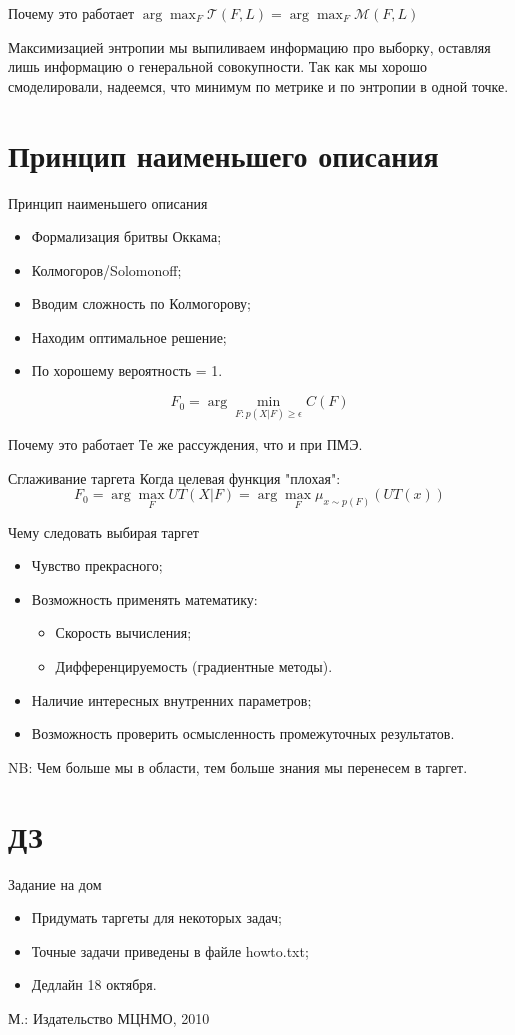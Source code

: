 \documentclass[14pt, fleqn, xcolor={dvipsnames, table}]{beamer}
\begin{document}
\begin{frame}{Почему это работает} %
$\arg\max_{F} \mathcal{T}(F, L) = \arg\max_{F} \mathcal{M}(F, L)$

Максимизацией энтропии мы выпиливаем информацию про выборку, оставляя лишь информацию о генеральной совокупности. Так как мы хорошо смоделировали, надеемся, что минимум по метрике и по энтропии в одной точке.
\end{frame}

\section{Принцип наименьшего описания}

\begin{frame}{Принцип наименьшего описания}
\begin{itemize}
  \item Формализация бритвы Оккама;
  \item Колмогоров/Solomonoff;
  \item Вводим сложность по Колмогорову;
  \item Находим оптимальное решение; 
  \item По хорошему вероятность = 1.
\end{itemize}
$$
  F_0 = \arg\min_{F:p(X|F)\ge\epsilon} C(F)
$$

\end{frame}

\begin{frame}{Почему это работает} %
Те же рассуждения, что и при ПМЭ.
\end{frame}

\begin{frame}{Сглаживание таргета}
\centering
Когда целевая функция "плохая":
$$
F_0 = \arg\max_F UT(X|F) = \arg\max_F \mu_{x \sim p(F)}(UT(x))
$$
\end{frame}

\begin{frame}{Чему следовать выбирая таргет}
\begin{itemize}
  \item Чувство прекрасного;
  \item Возможность применять математику:
  \begin{itemize}
    \item Скорость вычисления;
    \item Дифференцируемость (градиентные методы).
  \end{itemize}
  \item Наличие интересных внутренних параметров;
  \item Возможность проверить осмысленность промежуточных результатов.
\end{itemize}
NB: Чем больше мы в области, тем больше знания мы перенесем в таргет.
\end{frame}

\section{ДЗ}
\begin{frame}{Задание на дом}
\begin{itemize}
  \item Придумать таргеты для некоторых задач; 
  \item Точные задачи приведены в файле howto.txt; 
  \item Дедлайн 18 октября.
\end{itemize}
М.: Издательство МЦНМО, 2010
\end{frame}
\end{document}
